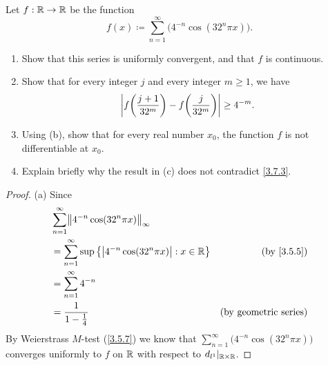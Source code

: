 \begin{ex}\label{ex:4.7.10}
  Let \(f : \mathbb{R} \to \mathbb{R}\) be the function
  \[
    f(x) \coloneqq \sum_{n = 1}^\infty \big(4^{-n} \cos(32^n \pi x)\big).
  \]
  \begin{enumerate}
    \item Show that this series is uniformly convergent, and that \(f\) is continuous.
    \item Show that for every integer \(j\) and every integer \(m \geq 1\), we have
          \[
            \left\lvert f\bigg(\frac{j + 1}{32^m}\bigg) - f\bigg(\frac{j}{32^m}\bigg)\right\rvert \geq 4^{-m}.
          \]
    \item Using (b), show that for every real number \(x_0\), the function \(f\) is not differentiable at \(x_0\).
    \item Explain briefly why the result in (c) does not contradict \cref{3.7.3}.
  \end{enumerate}
\end{ex}

\begin{proof}{(a)}
  Since
  \begin{align*}
     & \sum_{n = 1}^\infty \norm*{4^{-n} \cos(32^n \pi x)}_{\infty}                                                  \\
     & = \sum_{n = 1}^\infty \sup\big\{\abs{4^{-n} \cos(32^n \pi x)} : x \in \R\big\} & \text{(by \cref{3.5.5})}     \\
     & = \sum_{n = 1}^\infty 4^{-n}                                                                                  \\
     & = \frac{1}{1 - \frac{1}{4}}                                                    & \text{(by geometric series)}
  \end{align*}
  By Weierstrass \(M\)-test (\cref{3.5.7}) we know that \(\sum_{n = 1}^\infty \big(4^{-n} \cos(32^n \pi x)\big)\) converges uniformly to \(f\) on \(\mathbb{R}\) with respect to \(d_{l^1}|_{\mathbb{R} \times \mathbb{R}}\).
\end{proof}

